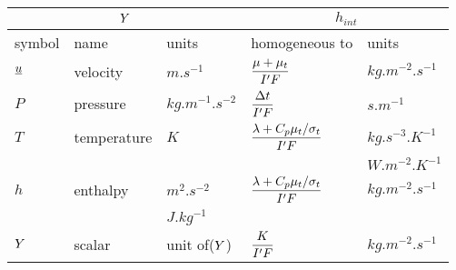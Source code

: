 \begin{table}
\begin{center}
\begin{tabular}{||l|l|l||l|l||}
\hline
\multicolumn{3}{||c||}{$Y$} & \multicolumn{2}{c||}{$h_{int}$}     \\
\hline
symbol                        & name                        & units                    & homogeneous to                        & units           \\
\hline
$\underline{u}$                    & velocity                    & $m.s^{-1}$               &$\dfrac{\mu+\mu_t}{ {I^\prime} F}$   & $kg.m^{-2}.s^{-1}$       \\
$P$                           & pressure                    & $kg.m^{-1}.s^{-2}$       & $\dfrac{\Delta t}{ {I^\prime} F}$   & $s.m^{-1}$                \\
$T$                           & temperature                 & $K$                      &$\dfrac{\lambda+C_p\mu_t/\sigma_t}{ {I^\prime} F}$  &$kg.s^{-3}.K^{-1}$\\
                              &                             &                          &                                       & $W.m^{-2}.K^{-1}$\\
$h$                           & enthalpy                    & $m^{2}.s^{-2}$           &$\dfrac{\lambda+C_p\mu_t/\sigma_t}{ {I^\prime} F}$ &$kg.m^{-2}.s^{-1}$\\
                              &                             & $J.kg^{-1} $             &                                                            &                                  \\
$Y$                      & scalar                      & unit of($Y$)       &$\dfrac{K}{ {I^\prime} F}$      & $kg.m^{-2}.s^{-1}$       \\
\hline
\end{tabular}
\end{center}


\end{table}
